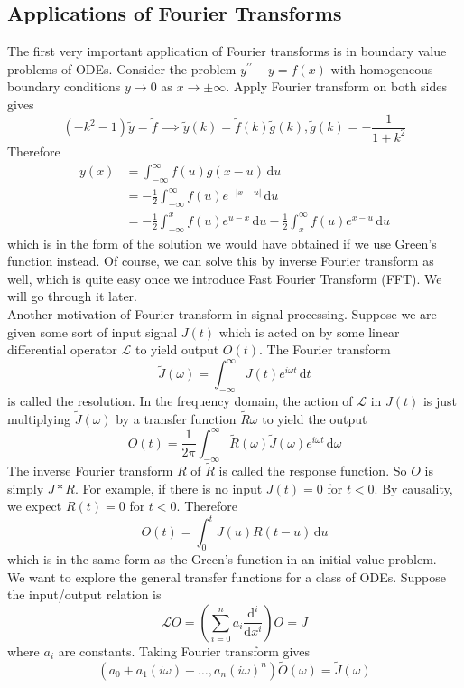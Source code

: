 \subsection{Applications of Fourier Transforms}
The first very important application of Fourier transforms is in boundary value problems of ODEs.
Consider the problem $y^{\prime\prime}-y=f(x)$ with homogeneous boundary conditions $y\to 0$ as $x\to\pm\infty$.
Apply Fourier transform on both sides gives
$$(-k^2-1)\tilde{y}=\tilde{f}\implies \tilde{y}(k)=\tilde{f}(k)\tilde{g}(k),\tilde{g}(k)=-\frac{1}{1+k^2}$$
Therefore
\begin{align*}
    y(x)&=\int_{-\infty}^\infty f(u)g(x-u)\,\mathrm du\\
    &=-\frac{1}{2}\int_{-\infty}^\infty f(u)e^{-|x-u|}\,\mathrm du\\
    &=-\frac{1}{2}\int_{-\infty}^xf(u)e^{u-x}\,\mathrm du-\frac{1}{2}\int_x^\infty f(u)e^{x-u}\,\mathrm du
\end{align*}
which is in the form of the solution we would have obtained if we use Green's function instead.
Of course, we can solve this by inverse Fourier transform as well, which is quite easy once we introduce Fast Fourier Transform (FFT).
We will go through it later.\\
Another motivation of Fourier transform in signal processing.
Suppose we are given some sort of input signal $J(t)$ which is acted on by some linear differential operator $\mathcal L$ to yield output $O(t)$.
The Fourier transform
$$\tilde{J}(\omega)=\int_{-\infty}^\infty J(t)e^{i\omega t}\,\mathrm dt$$
is called the resolution.
In the frequency domain, the action of $\mathcal L$ in $J(t)$ is just multiplying $\tilde{J}(\omega)$ by a transfer function $\tilde{R}\omega$ to yield the output
$$O(t)=\frac{1}{2\pi}\int_{-\infty}^\infty\tilde{R}(\omega)\tilde{J}(\omega)e^{i\omega t}\,\mathrm d\omega$$
The inverse Fourier transform $R$ of $\tilde{R}$ is called the response function.
So $O$ is simply $J\ast R$.
For example, if there is no input $J(t)=0$ for $t<0$.
By causality, we expect $R(t)=0$ for $t<0$.
Therefore
$$O(t)=\int_0^tJ(u)R(t-u)\,\mathrm du$$
which is in the same form as the Green's function in an initial value problem.\\
We want to explore the general transfer functions for a class of ODEs.
Suppose the input/output relation is
$$\mathcal LO=\left( \sum_{i=0}^na_i\frac{\mathrm d^i}{\mathrm dx^i} \right)O=J$$
where $a_i$ are constants.
Taking Fourier transform gives
$$(a_0+a_1(i\omega)+\ldots,a_n(i\omega)^n)\tilde{O}(\omega)=\tilde{J}(\omega)$$
